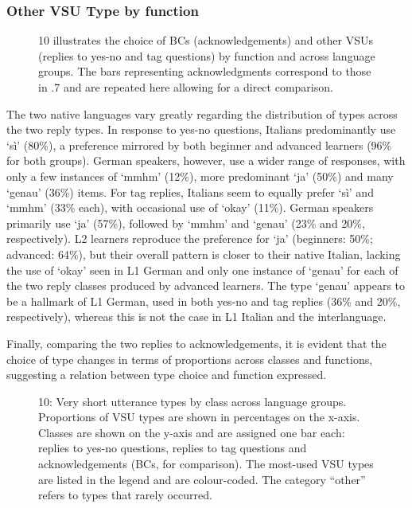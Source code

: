 \subsubsection{Other VSU Type by function}
\hypertarget{Toc191305956}{}\begin{figure}
\caption{10 illustrates the choice of BCs (acknowledgements) and other VSUs (replies to yes-no and tag questions) by function and across language groups. The bars representing acknowledgments correspond to those in .7 and are repeated here allowing for a direct comparison.}
\label{fig:key:4}
\end{figure}

The two native languages vary greatly regarding the distribution of types across the two reply types. In response to yes-no questions, Italians predominantly use ‘sì’ (80\%), a preference mirrored by both beginner and advanced learners (96\% for both groups). German speakers, however, use a wider range of responses, with only a few instances of ‘mmhm’ (12\%), more predominant ‘ja’ (50\%) and many ‘genau’ (36\%) items. For tag replies, Italians seem to equally prefer ‘sì’ and ‘mmhm’ (33\% each), with occasional use of ‘okay’ (11\%). German speakers primarily use ‘ja’ (57\%), followed by ‘mmhm’ and ‘genau’ (23\% and 20\%, respectively). L2 learners reproduce the preference for ‘ja’ (beginners: 50\%; advanced: 64\%), but their overall pattern is closer to their native Italian, lacking the use of ‘okay’ seen in L1 German and only one instance of ‘genau’ for each of the two reply classes produced by advanced learners. The type ‘genau’ appears to be a hallmark of L1 German, used in both yes-no and tag replies (36\% and 20\%, respectively), whereas this is not the case in L1 Italian and the interlanguage.

Finally, comparing the two replies to acknowledgements, it is evident that the choice of type changes in terms of proportions across classes and functions, suggesting a relation between type choice and function expressed.

  
 

\begin{stylecaption}\begin{figure}
\caption{10: Very short utterance types by class across language groups. Proportions of VSU types are shown in percentages on the x-axis. Classes are shown on the y-axis and are assigned one bar each: replies to yes-no questions, replies to tag questions and acknowledgements (BCs, for comparison). The most-used VSU types are listed in the legend and are colour-coded. The category “other” refers to types that rarely occurred.}
\label{fig:key:4}
\end{figure}\end{stylecaption}

